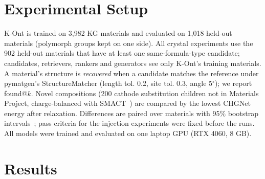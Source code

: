 \documentclass[conference]{IEEEtran}
\begin{document}
\section{Experimental Setup}
K-Ont is trained on 3,982 KG materials and evaluated on 1,018 held-out materials (polymorph groups kept on one side). All crystal experiments use the 902 held-out materials that have at least one same-formula-type candidate; candidates, retrievers, rankers and generators see only K-Ont's training materials. A material's structure is \emph{recovered} when a candidate matches the reference under pymatgen's StructureMatcher (length tol. 0.2, site tol. 0.3, angle 5$^\circ$); we report found@$k$. Novel compositions (200 cathode substitution children not in Materials Project, charge-balanced with SMACT~\cite{davies2019smact}) are compared by the lowest CHGNet energy after relaxation. Differences are paired over materials with 95\% bootstrap intervals~\cite{efron1994bootstrap}; pass criteria for the injection experiments were fixed before the runs. All models were trained and evaluated on one laptop GPU (RTX 4060, 8 GB).

\section{Results}
\end{document}
